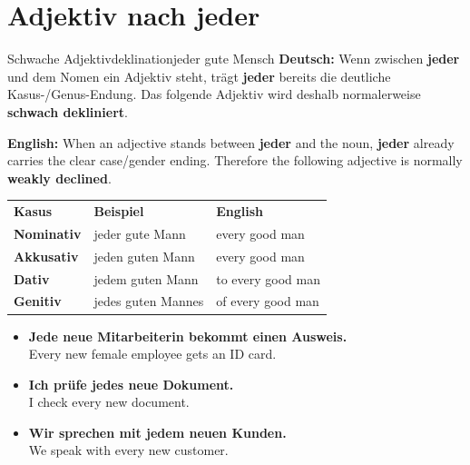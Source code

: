 \documentclass[a4paper,11pt]{article}
\newcommand{\GermanText}[1]{\textbf{Deutsch: }#1\par}
\newcommand{\EnglishText}[1]{{\small\color{SoftGray}\textbf{English: }#1\par}}
\newcommand{\ExampleItem}[2]{\item \textbf{#1}\\{\small\color{SoftGray}#2}}
\begin{document}
\section{Adjektiv nach jeder}
\begin{grammarentry}{Schwache Adjektivdeklination}{jeder gute Mensch}
\GermanText{Wenn zwischen \textbf{jeder} und dem Nomen ein Adjektiv steht, trägt \textbf{jeder} bereits die deutliche Kasus-/Genus-Endung. Das folgende Adjektiv wird deshalb normalerweise \textbf{schwach dekliniert}.}
\EnglishText{When an adjective stands between \textbf{jeder} and the noun, \textbf{jeder} already carries the clear case/gender ending. Therefore the following adjective is normally \textbf{weakly declined}.}
\end{grammarentry}

\begin{longtable}{>{\bfseries}p{2.5cm}|p{4.8cm}|p{6.0cm}}
\rowcolor{HeaderBlueDark}
\color{white}\textbf{Kasus} & \color{white}\textbf{Beispiel} & \color{white}\textbf{English} \\
Nominativ & jeder gute Mann & every good man \\
Akkusativ & jeden guten Mann & every good man \\
Dativ & jedem guten Mann & to every good man \\
Genitiv & jedes guten Mannes & of every good man \\
\end{longtable}

\begin{exbox}
\begin{itemize}
\ExampleItem{Jede neue Mitarbeiterin bekommt einen Ausweis.}{Every new female employee gets an ID card.}
\ExampleItem{Ich prüfe jedes neue Dokument.}{I check every new document.}
\ExampleItem{Wir sprechen mit jedem neuen Kunden.}{We speak with every new customer.}
\end{itemize}
\end{exbox}
\end{document}
